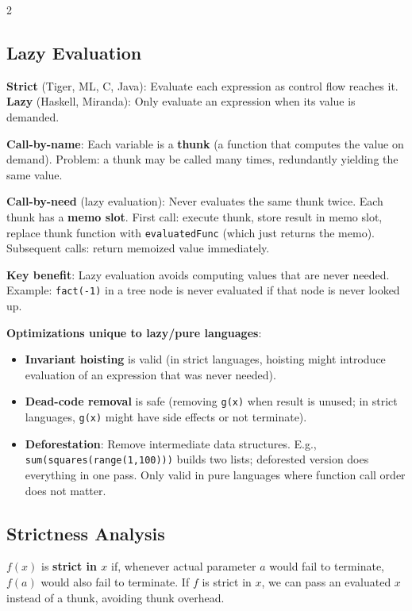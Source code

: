 \documentclass[9pt,landscape]{extarticle}
\begin{document}
\begin{multicols}{2}
\subsection{Lazy Evaluation}

\textbf{Strict} (Tiger, ML, C, Java): Evaluate each expression as control flow reaches it. \textbf{Lazy} (Haskell, Miranda): Only evaluate an expression when its value is demanded.

\textbf{Call-by-name}: Each variable is a \textbf{thunk} (a function that computes the value on demand). Problem: a thunk may be called many times, redundantly yielding the same value.

\textbf{Call-by-need} (lazy evaluation): Never evaluates the same thunk twice. Each thunk has a \textbf{memo slot}. First call: execute thunk, store result in memo slot, replace thunk function with \texttt{evaluatedFunc} (which just returns the memo). Subsequent calls: return memoized value immediately.

\textbf{Key benefit}: Lazy evaluation avoids computing values that are never needed. Example: \texttt{fact(-1)} in a tree node is never evaluated if that node is never looked up.

\textbf{Optimizations unique to lazy/pure languages}:
\begin{itemize}
  \item \textbf{Invariant hoisting} is valid (in strict languages, hoisting might introduce evaluation of an expression that was never needed).
  \item \textbf{Dead-code removal} is safe (removing \texttt{g(x)} when result is unused; in strict languages, \texttt{g(x)} might have side effects or not terminate).
  \item \textbf{Deforestation}: Remove intermediate data structures. E.g., \texttt{sum(squares(range(1,\allowbreak{}100)))} builds two lists; deforested version does everything in one pass. Only valid in pure languages where function call order does not matter.
\end{itemize}

\subsection{Strictness Analysis}

$f(x)$ is \textbf{strict in $x$} if, whenever actual parameter $a$ would fail to terminate, $f(a)$ would also fail to terminate. If $f$ is strict in $x$, we can pass an evaluated $x$ instead of a thunk, avoiding thunk overhead.


\end{multicols}
\end{document}
